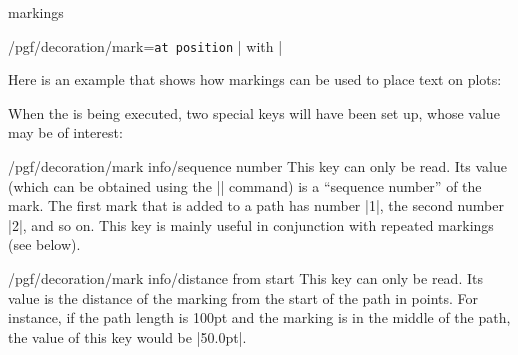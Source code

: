 \begin{decoration}{markings}
\begin{key}{/pgf/decoration/mark=\texttt{at position}
      | with |}
\begin{codeexample}[]
\end{codeexample}

    Here is an example that shows how markings can be used to place text
    on plots:
\begin{codeexample}[]
\end{codeexample}

    When the  is being executed, two special keys will have
    been set up, whose value may be of interest:
    \begin{key}{/pgf/decoration/mark info/sequence number}
      This key can only be read. Its value (which can be obtained
      using the |\pgfkeysvalueof| command) is a ``sequence number'' of
      the mark. The first mark that is added to a path has number |1|,
      the second number |2|, and so on. This key is mainly useful in
      conjunction with repeated markings (see below).
    \end{key}
    \begin{key}{/pgf/decoration/mark info/distance from start}
      This key can only be read. Its value is the distance of the
      marking from the start of the path in points. For instance, if
      the path length is 100pt and the marking is in the middle of the
      path, the value of this key would be |50.0pt|.
    \end{key}
  \end{key}


\end{decoration}
